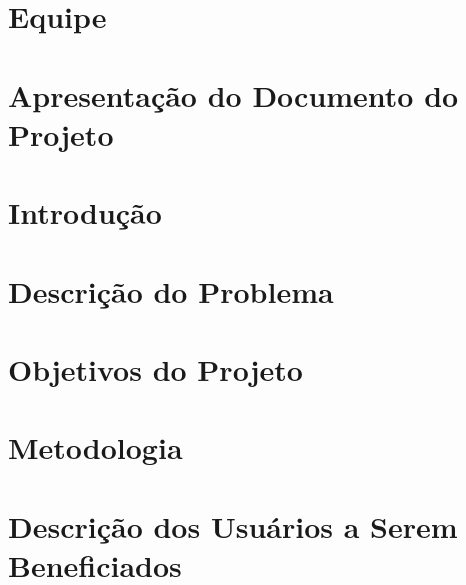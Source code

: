 \section{Equipe} %
\label{sec:introdu_o}
 

\section{Apresentação do Documento do Projeto} %
\label{sec:introdu_o}
 

\section{Introdução} %
\label{sec:introdu_o}
 

\section{Descrição do Problema} %
\label{sec:fundamentacao}
 

% 

\section{Objetivos do Projeto} %
\label{sec:introdu_o}
 

\section{Metodologia} %
\label{sec:metodologia}
 

\section{Descrição dos Usuários a Serem Beneficiados} %
\label{sec:introdu_o}
 

% 

